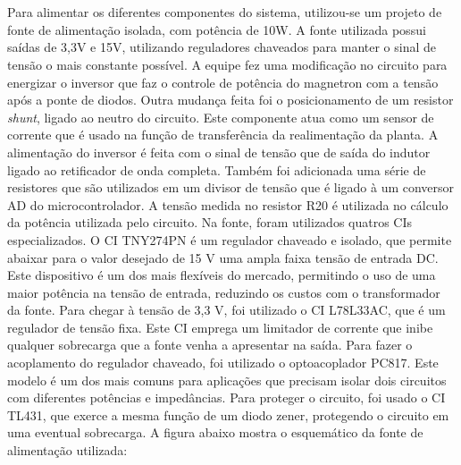 \section{}
\label{sec:font}

 Para alimentar os diferentes componentes do sistema, utilizou-se um projeto de fonte de alimentação isolada, com potência de 10W. A fonte utilizada possui saídas de 3,3V e 15V, utilizando reguladores chaveados para manter o sinal de tensão o mais constante possível. A equipe fez uma modificação no circuito para energizar o inversor que faz o controle de potência do magnetron com a tensão após a ponte de diodos. Outra mudança feita foi o posicionamento de um resistor \textit{shunt}, ligado ao neutro do circuito. Este componente atua como um sensor de corrente que é usado na função de transferência da realimentação da planta. A alimentação do inversor é feita com o sinal de tensão que de saída do indutor ligado ao retificador de onda completa. Também foi adicionada uma série de resistores que são utilizados em um divisor de tensão que é ligado à um conversor AD do microcontrolador. A tensão medida no resistor R20 é utilizada no cálculo da potência utilizada pelo circuito. Na fonte, foram utilizados quatros CIs especializados. O CI TNY274PN é um regulador chaveado e isolado, que permite abaixar para o valor desejado de 15 V uma ampla faixa tensão de entrada DC. Este dispositivo é um dos mais flexíveis do mercado, permitindo o uso de uma maior potência na tensão de entrada, reduzindo os custos com o transformador da fonte. Para chegar à tensão de 3,3 V, foi utilizado o CI L78L33AC, que é um regulador de tensão fixa. Este CI emprega um limitador de corrente que inibe qualquer sobrecarga que a fonte venha a apresentar na saída. Para fazer o acoplamento do regulador chaveado, foi utilizado o optoacoplador PC817. Este modelo é um dos mais comuns para aplicações que precisam isolar dois circuitos com diferentes potências e impedâncias. Para proteger o circuito, foi usado o CI TL431, que exerce a mesma função de um diodo zener, protegendo o circuito em uma eventual sobrecarga. A figura abaixo mostra o esquemático da fonte de alimentação utilizada:

